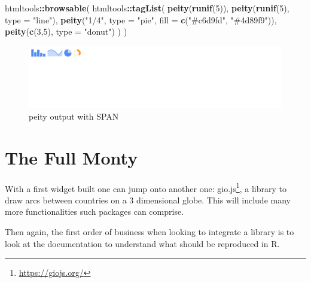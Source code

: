 \documentclass[
]{krantz}
\makeatletter
\newenvironment{Shaded}{\begin{snugshade}}{\end{snugshade}}
\newcommand{\DataTypeTok}[1]{\textcolor[rgb]{0.27,0.27,0.27}{#1}}
\newcommand{\DecValTok}[1]{\textcolor[rgb]{0.06,0.06,0.06}{#1}}
\newcommand{\KeywordTok}[1]{\textcolor[rgb]{0.27,0.27,0.27}{\textbf{#1}}}
\newcommand{\NormalTok}[1]{#1}
\newcommand{\OperatorTok}[1]{\textcolor[rgb]{0.43,0.43,0.43}{\textbf{#1}}}
\newcommand{\StringTok}[1]{\textcolor[rgb]{0.5,0.5,0.5}{#1}}
\renewcommand{\href}[2]{#2\footnote{\url{#1}}}
\newenvironment{kframe}{%
\medskip{}
\setlength{\fboxsep}{.8em}
 \def\at@end@of@kframe{}%
 \ifinner\ifhmode%
  \def\at@end@of@kframe{\end{minipage}}%
  \begin{minipage}{\columnwidth}%
 \fi\fi%
 \def\FrameCommand##1{\hskip\@totalleftmargin \hskip-\fboxsep
 \colorbox{shadecolor}{##1}\hskip-\fboxsep
     \hskip-\linewidth \hskip-\@totalleftmargin \hskip\columnwidth}%
 \MakeFramed {\advance\hsize-\width
   \@totalleftmargin\z@ \linewidth\hsize
   \@setminipage}}%
 {\par\unskip\endMakeFramed%
 \at@end@of@kframe}
\renewenvironment{Shaded}{\begin{kframe}}{\end{kframe}}
\makeatother
\begin{document}
\begin{Shaded}
\begin{Highlighting}[]
\NormalTok{htmltools}\OperatorTok{::}\KeywordTok{browsable}\NormalTok{(}
\NormalTok{  htmltools}\OperatorTok{::}\KeywordTok{tagList}\NormalTok{(}
    \KeywordTok{peity}\NormalTok{(}\KeywordTok{runif}\NormalTok{(}\DecValTok{5}\NormalTok{)),}
    \KeywordTok{peity}\NormalTok{(}\KeywordTok{runif}\NormalTok{(}\DecValTok{5}\NormalTok{), }\DataTypeTok{type =} \StringTok{"line"}\NormalTok{),}
    \KeywordTok{peity}\NormalTok{(}\StringTok{"1/4"}\NormalTok{, }\DataTypeTok{type =} \StringTok{"pie"}\NormalTok{, }\DataTypeTok{fill =} \KeywordTok{c}\NormalTok{(}\StringTok{"\#c6d9fd"}\NormalTok{, }\StringTok{"\#4d89f9"}\NormalTok{)),}
    \KeywordTok{peity}\NormalTok{(}\KeywordTok{c}\NormalTok{(}\DecValTok{3}\NormalTok{,}\DecValTok{5}\NormalTok{), }\DataTypeTok{type =} \StringTok{"donut"}\NormalTok{)}
\NormalTok{  )}
\NormalTok{)}
\end{Highlighting}
\end{Shaded}

\begin{figure}
\centering
\includegraphics{images/peity-span.png}
\caption{peity output with SPAN}
\end{figure}

\hypertarget{widgets-full}{%
\chapter{The Full Monty}\label{widgets-full}}

With a first widget built one can jump onto another one: \href{https://giojs.org/}{gio.js}, a library to draw arcs between countries on a 3 dimensional globe. This will include many more functionalities such packages can comprise.

Then again, the first order of business when looking to integrate a library is to look at the documentation to understand what should be reproduced in R.
\end{document}
